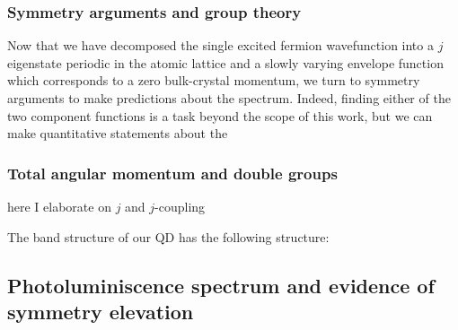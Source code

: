 \subsubsection{Symmetry arguments and group theory}
Now that we have decomposed the single excited fermion wavefunction into a $j$ eigenstate periodic in the atomic lattice and a slowly varying envelope function which corresponds to a zero bulk-crystal momentum, we turn to symmetry arguments to make predictions about the spectrum. Indeed, finding either of the two component functions is a task beyond the scope of this work, but we can make quantitative statements about the 



\subsubsection{Total angular momentum and double groups}
here I elaborate on $j$ and $j$-coupling

The band structure of our QD has the following structure:

\subsection{Photoluminiscence spectrum and evidence of symmetry elevation}


